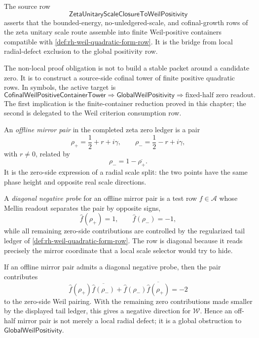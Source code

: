 \begin{definition}
\label{def:rh-scale-closure-to-weil-positivity-row}
The source row
$$
\mathsf{ZetaUnitaryScaleClosureToWeilPositivity}
$$
asserts that the bounded-energy, no-unledgered-scale, and cofinal-growth
rows of the zeta unitary scale route assemble into finite
Weil-positive containers compatible with
\autoref{def:rh-weil-quadratic-form-row}.  It is the bridge from local
radial-defect exclusion to the global positivity row.
\end{definition}

\begin{principle}
\label{prin:rh-final-non-local-proof-obligation}
The non-local proof obligation is not to build a stable packet around a
candidate zero.  It is to construct a source-side cofinal tower of
finite positive quadratic rows.  In symbols, the active target is
$$
\mathsf{CofinalWeilPositiveContainerTower}
\Longrightarrow
\mathsf{GlobalWeilPositivity}
\Longrightarrow
\text{fixed-half zero readout}.
$$
The first implication is the finite-container reduction proved in this
chapter; the second is delegated to the Weil criterion consumption row.
\end{principle}

\begin{definition}
\label{def:rh-offline-mirror-pair}
An \emph{offline mirror pair} in the completed zeta zero ledger is a pair
$$
\rho_+=\frac12+r+i\gamma,
\qquad
\rho_-=\frac12-r+i\gamma,
$$
with $r\ne0$, related by
$$
\rho_-=1-\overline{\rho_+}.
$$
It is the zero-side expression of a radial scale split: the two points
have the same phase height and opposite real scale directions.
\end{definition}

\begin{definition}
\label{def:rh-diagonal-negative-probe}
A \emph{diagonal negative probe} for an offline mirror pair is a test
row $f\in\mathcal A$ whose Mellin readout separates the pair by
opposite signs,
$$
\widehat f(\rho_+)=1,
\qquad
\widehat f(\rho_-)=-1,
$$
while all remaining zero-side contributions are controlled by the
regularized tail ledger of
\autoref{def:rh-weil-quadratic-form-row}.  The row is diagonal because
it reads precisely the mirror coordinate that a local scale selector
would try to hide.
\end{definition}

\begin{principle}
\label{prin:rh-offline-mirror-pairs-create-negative-weil-directions}
If an offline mirror pair admits a diagonal negative probe, then the
pair contributes
$$
\widehat f(\rho_+)\overline{\widehat f(\rho_-)}
+
\widehat f(\rho_-)\overline{\widehat f(\rho_+)}
=
-2
$$
to the zero-side Weil pairing.  With the remaining zero contributions
made smaller by the displayed tail ledger, this gives a negative
direction for $\mathcal W$.  Hence an off-half mirror pair is not merely
a local radial defect; it is a global obstruction to
$\mathsf{GlobalWeilPositivity}$.
\end{principle}


